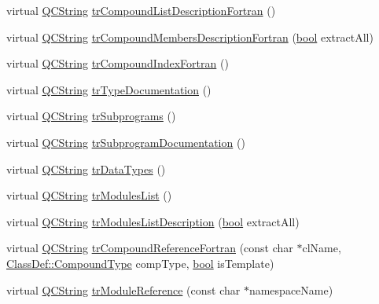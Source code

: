 \begin{DoxyCompactItemize}
virtual \hyperlink{class_q_c_string}{Q\+C\+String} \hyperlink{class_translator_portuguese_a1e8ca72a3baecb7a7de0efea29c1e607}{tr\+Compound\+List\+Description\+Fortran} ()
\item 
virtual \hyperlink{class_q_c_string}{Q\+C\+String} \hyperlink{class_translator_portuguese_a4d41bc71ac5698f2ce1486d2a2f8e74d}{tr\+Compound\+Members\+Description\+Fortran} (\hyperlink{qglobal_8h_a1062901a7428fdd9c7f180f5e01ea056}{bool} extract\+All)
\item 
virtual \hyperlink{class_q_c_string}{Q\+C\+String} \hyperlink{class_translator_portuguese_abff94ae8e973957af7d2f3e65ec6cadc}{tr\+Compound\+Index\+Fortran} ()
\item 
virtual \hyperlink{class_q_c_string}{Q\+C\+String} \hyperlink{class_translator_portuguese_ab8c351e04f153f0176618fba500a325c}{tr\+Type\+Documentation} ()
\item 
virtual \hyperlink{class_q_c_string}{Q\+C\+String} \hyperlink{class_translator_portuguese_ae3921a56819b66c9fe81c959828c3238}{tr\+Subprograms} ()
\item 
virtual \hyperlink{class_q_c_string}{Q\+C\+String} \hyperlink{class_translator_portuguese_a84b625f6d42d7cfa631345c400d13ed5}{tr\+Subprogram\+Documentation} ()
\item 
virtual \hyperlink{class_q_c_string}{Q\+C\+String} \hyperlink{class_translator_portuguese_ae093d4bfe038bacb3f4c0313196db34f}{tr\+Data\+Types} ()
\item 
virtual \hyperlink{class_q_c_string}{Q\+C\+String} \hyperlink{class_translator_portuguese_af40f9186ffc3ad503109004b16de9102}{tr\+Modules\+List} ()
\item 
virtual \hyperlink{class_q_c_string}{Q\+C\+String} \hyperlink{class_translator_portuguese_a26f0e8e3e292052ff9893df61d6a1fa3}{tr\+Modules\+List\+Description} (\hyperlink{qglobal_8h_a1062901a7428fdd9c7f180f5e01ea056}{bool} extract\+All)
\item 
virtual \hyperlink{class_q_c_string}{Q\+C\+String} \hyperlink{class_translator_portuguese_aea1e34a1ca649b821afa250d2f105c14}{tr\+Compound\+Reference\+Fortran} (const char $\ast$cl\+Name, \hyperlink{class_class_def_ae70cf86d35fe954a94c566fbcfc87939}{Class\+Def\+::\+Compound\+Type} comp\+Type, \hyperlink{qglobal_8h_a1062901a7428fdd9c7f180f5e01ea056}{bool} is\+Template)
\item 
virtual \hyperlink{class_q_c_string}{Q\+C\+String} \hyperlink{class_translator_portuguese_a3bc783bc6fd0bd8b2731e28fea439660}{tr\+Module\+Reference} (const char $\ast$namespace\+Name)
\item 

\end{DoxyCompactItemize}
